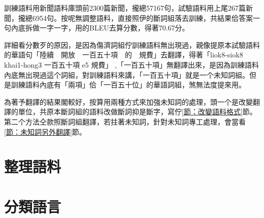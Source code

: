 訓練語料用新聞語料庫頭前2300篇新聞，攏總57167句，試驗語料用上尾267篇新聞，攏總6954句。按呢無調整語料，直接照伊的斷詞組落去訓練，共結果佮答案一句內底拆做一字一字，用的BLEU去算分數，得著70.67分。

詳細看分數歹的原因，是因為傷濟詞組佇訓練語料無出現過，親像提原本試驗語料的華語句「陸續　開放　一百五十項　的　規費」去翻譯，得著「liok8-siok8 khai1-hong3 一百五十項 e5 規費」 ,「一百五十項」無翻譯出來，是因為訓練語料內底無出現過這个詞組，對訓練語料來講，「一百五十項」就是一个未知詞組。但是訓練語料內底有「兩項」佮「一百五十位」的華語詞組，煞無法度提來用。

為著予翻譯的結果閣較好，按算用兩種方式來加強未知詞的處理，頭一个是改變翻譯的單位，共原本斷詞組的語料改做斷詞抑是斷字，寫佇\ref{節：改變語料格式}節。第二个方法仝款照斷詞組翻譯，若拄著未知詞，針對未知詞專工處理，會當看\ref{節：未知詞另外翻譯}節。

\section{整理語料}
\label{節：整理語料}
\section{分類語言}
\label{節：分類語言}